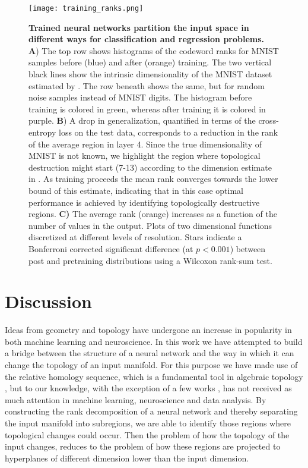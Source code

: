 \begin{figure}
    \centering
    \texttt{[image: training\_ranks.png]}
    \caption{\textbf{Trained neural networks partition the input space in different ways for classification and regression problems.}\\
    \textbf{A}) The top row shows histograms of the codeword ranks for MNIST samples before (blue) and after (orange) training. The two vertical black lines show the intrinsic dimensionality of the MNIST dataset estimated by \cite{pope2021intrinsic}. The row beneath shows the same, but for random noise samples instead of MNIST digits. The histogram before training is colored in green, whereas after training it is colored in purple.
    \textbf{B}) A drop in generalization, quantified in terms of the cross-entropy loss on the test data, corresponds to a reduction in the rank of the average region in layer 4. Since the true dimensionality of MNIST is not known, we highlight the region where topological destruction might start (7-13) according to the dimension estimate in \cite{pope2021intrinsic}. As training proceeds the mean rank converges towards the lower bound of this estimate, indicating that in this case optimal performance is achieved by identifying topologically destructive regions.
    \textbf{C)}  The average rank (orange) increases as a function of the number of values in the output. Plots of two dimensional functions discretized at different levels of resolution. Stars indicate a Bonferroni corrected significant difference (at $p < 0.001$) between post and pretraining distributions using a Wilcoxon rank-sum test.}
    \label{fig:training_ranks}
\end{figure}

\section{Discussion}
Ideas from geometry and topology have undergone an increase in popularity in both machine learning and neuroscience. In this work we have attempted to build a bridge between the structure of a neural network and the way in which it can change the topology of an input manifold. For this purpose we have made use of the relative homology sequence, which is a fundamental tool in algebraic topology \cite{hatcher2005algebraic}, but to our knowledge, with the exception of a few works \cite{pokorny2016topological, blaser2022relative}, has not received as much attention in machine learning, neuroscience and data analysis. By constructing the rank decomposition of a neural network and thereby separating the input manifold into subregions, we are able to identify those regions where topological changes could occur. Then the problem of how the topology of the input changes, reduces to the problem of how these regions are projected to hyperplanes of different dimension lower than the input dimension.

